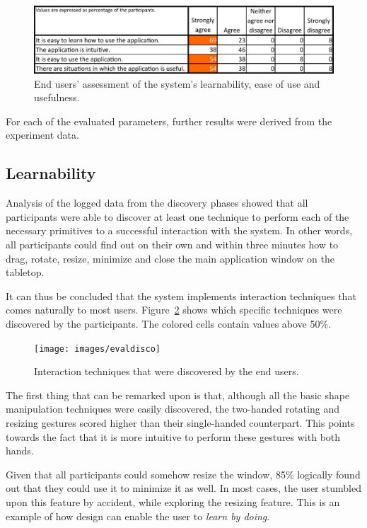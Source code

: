 \begin{figure}[htb]
  \centering
    \includegraphics[width=1\textwidth]{images/evalagree}
    \caption{End users' assessment of the system's learnability, ease of use and usefulness.}
    \label{fig:evalagree}
\end{figure}

For each of the evaluated parameters, further results were derived from the experiment data.

\subsection{Learnability}

Analysis of the logged data from the discovery phases showed that all participants were able to discover at least one technique to perform each of the necessary primitives to a successful interaction with the system.
In other words, all participants could find out on their own and within three minutes how to drag, rotate, resize, minimize and close the main application window on the tabletop.

It can thus be concluded that the system implements interaction techniques that comes naturally to most users.
Figure~\ref{fig:evaldisco} shows which specific techniques were discovered by the participants. The colored cells contain values above 50\%.

\begin{figure}[htb]
  \centering
    \texttt{[image: images/evaldisco]}
    \caption{Interaction techniques that were discovered by the end users.}
    \label{fig:evaldisco}
\end{figure}

The first thing that can be remarked upon is that, although all the basic shape manipulation techniques were easily discovered, the two-handed rotating and resizing gestures scored higher than their single-handed counterpart.
This points towards the fact that it is more intuitive to perform these gestures with both hands.

Given that all participants could somehow resize the window, 85\% logically found out that they could use it to minimize it as well.
In most cases, the user stumbled upon this feature by accident, while exploring the resizing feature.
This is an example of how design can enable the user to \emph{learn by doing}.

